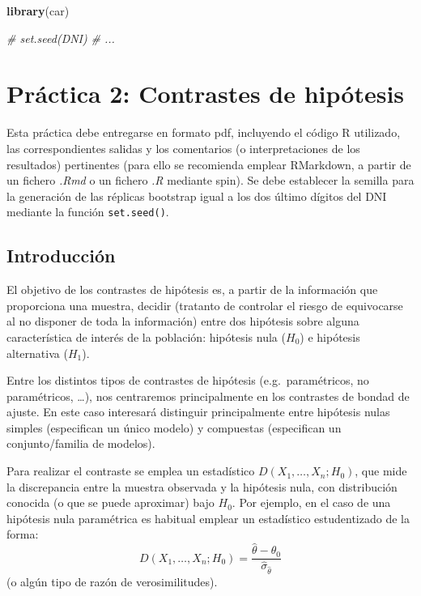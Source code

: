 \documentclass[
]{book}
\newenvironment{Shaded}{\begin{snugshade}}{\end{snugshade}}
\newcommand{\CommentTok}[1]{\textcolor[rgb]{0.56,0.35,0.01}{\textit{#1}}}
\newcommand{\KeywordTok}[1]{\textcolor[rgb]{0.13,0.29,0.53}{\textbf{#1}}}
\newcommand{\NormalTok}[1]{#1}
\theoremstyle{definition}
\theoremstyle{definition}
\theoremstyle{definition}
\theoremstyle{remark}
\begin{document}
\begin{Shaded}
\begin{Highlighting}[]
\KeywordTok{library}\NormalTok{(car)}

\CommentTok{# set.seed(DNI)}
\CommentTok{# ...}
\end{Highlighting}
\end{Shaded}

\hypertarget{practica2}{%
\chapter{Práctica 2: Contrastes de hipótesis}\label{practica2}}

Esta práctica debe entregarse en formato pdf,
incluyendo el código R utilizado, las correspondientes salidas
y los comentarios (o interpretaciones de los resultados) pertinentes
(para ello se recomienda emplear RMarkdown,
a partir de un fichero \emph{.Rmd} o un fichero \emph{.R} mediante spin).
Se debe establecer la semilla para la generación de las réplicas bootstrap
igual a los dos último dígitos del DNI mediante la función \texttt{set.seed()}.

\hypertarget{introducciuxf3n-1}{%
\section{Introducción}\label{introducciuxf3n-1}}

El objetivo de los contrastes de hipótesis es, a partir de la información
que proporciona una muestra, decidir (tratanto de controlar el riesgo de
equivocarse al no disponer de toda la información)
entre dos hipótesis sobre alguna característica de interés de la población:
hipótesis nula (\(H_{0}\)) e hipótesis alternativa (\(H_{1}\)).

Entre los distintos tipos de contrastes de hipótesis (e.g.~paramétricos,
no paramétricos, \ldots), nos centraremos principalmente en los contrastes
de bondad de ajuste. En este caso interesará distinguir principalmente
entre hipótesis nulas simples (especifican un único modelo) y compuestas
(especifican un conjunto/familia de modelos).

Para realizar el contraste se emplea un estadístico \(D\left( X_1,\ldots ,X_n;H_0\right)\),
que mide la discrepancia entre la muestra observada y la hipótesis nula,
con distribución conocida (o que se puede aproximar) bajo \(H_0\).
Por ejemplo, en el caso de una hipótesis nula paramétrica
es habitual emplear un estadístico estudentizado de la forma:
\[D\left( X_1,\ldots ,X_n;H_0\right) =
\frac{\hat{\theta}-\theta _0}{\hat\sigma_{\hat\theta}}\]
(o algún tipo de razón de verosimilitudes).
\end{document}
